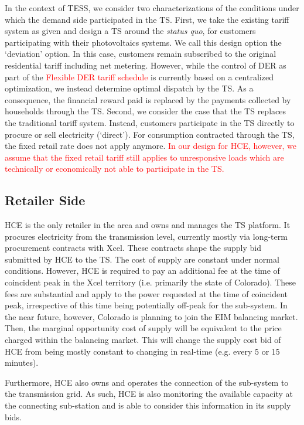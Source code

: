 In the context of TESS, we consider two characterizations of the conditions under which the demand side participated in the TS. First, we take the existing tariff system as given and design a TS around the \textit{status quo}, for customers participating with their photovoltaics systems. We call this design option the `deviation' option. In this case, customers remain subscribed to the original residential tariff including net metering. However, while the control of DER as part of the \textcolor{red}{Flexible DER tariff schedule} is currently based on a centralized optimization, we instead determine optimal dispatch by the TS. As a consequence, the financial reward paid is replaced by the payments collected by households through the TS.
Second, we consider the case that the TS replaces the traditional tariff system. Instead, customers participate in the TS directly to procure or sell electricity (`direct'). For consumption contracted through the TS, the fixed retail rate does not apply anymore. 
\textcolor{red}{In our design for HCE, however, we assume that the fixed retail tariff still applies to unresponsive loads which are technically or economically not able to participate in the TS.}

\subsection{Retailer Side}

HCE is the only retailer in the area and owns and manages the TS platform. It procures electricity from the transmission level, currently mostly via long-term procurement contracts with Xcel. These contracts shape the supply bid submitted by HCE to the TS. The cost of supply are constant under normal conditions. However, HCE is required to pay an additional fee at the time of coincident peak in the Xcel territory (i.e. primarily the state of Colorado). These fees are substantial and apply to the power requested at the time of coincident peak, irrespective of this time being potentially off-peak for the sub-system. In the near future, however, Colorado is planning to join the EIM balancing market. Then, the marginal opportunity cost of supply will be equivalent to the price charged within the balancing market. This will change the supply cost bid of HCE from being mostly constant to changing in real-time (e.g. every 5 or 15 minutes).

Furthermore, HCE also owns and operates the connection of the sub-system to the transmission grid. As such, HCE is also monitoring the available capacity at the connecting sub-station and is able to consider this information in its supply bids. 

